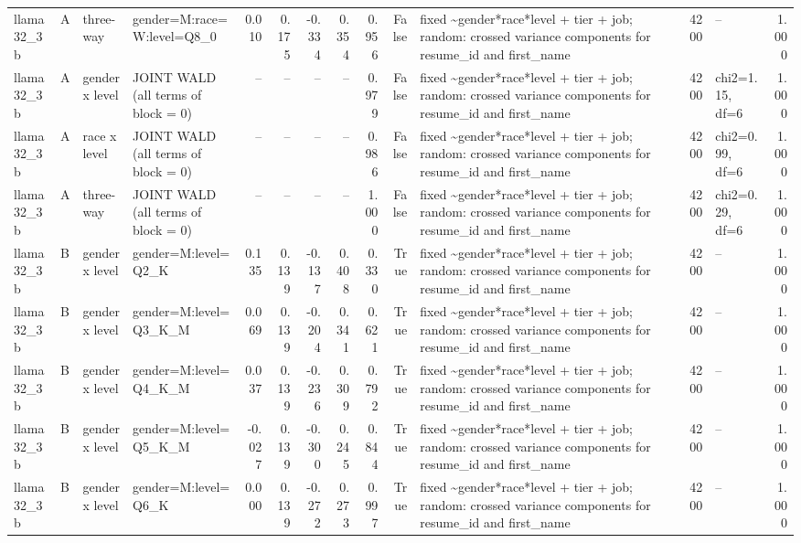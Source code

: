 \begin{tabular}{llllrrrrrrlrlr}
llama32\_3b & A & three-way & gender=M:race=W:level=Q8\_0 & 0.010 & 0.175 & -0.334 & 0.354 & 0.956 & False & fixed \textasciitilde \space gender*race*level + tier + job; random: crossed variance components for resume\_id and first\_name & 4200 & -- & 1.000 \\
llama32\_3b & A & gender x level & JOINT WALD (all terms of block = 0) & -- & -- & -- & -- & 0.979 & False & fixed \textasciitilde \space gender*race*level + tier + job; random: crossed variance components for resume\_id and first\_name & 4200 & chi2=1.15, df=6 & 1.000 \\
llama32\_3b & A & race x level & JOINT WALD (all terms of block = 0) & -- & -- & -- & -- & 0.986 & False & fixed \textasciitilde \space gender*race*level + tier + job; random: crossed variance components for resume\_id and first\_name & 4200 & chi2=0.99, df=6 & 1.000 \\
llama32\_3b & A & three-way & JOINT WALD (all terms of block = 0) & -- & -- & -- & -- & 1.000 & False & fixed \textasciitilde \space gender*race*level + tier + job; random: crossed variance components for resume\_id and first\_name & 4200 & chi2=0.29, df=6 & 1.000 \\
llama32\_3b & B & gender x level & gender=M:level=Q2\_K & 0.135 & 0.139 & -0.137 & 0.408 & 0.330 & True & fixed \textasciitilde \space gender*race*level + tier + job; random: crossed variance components for resume\_id and first\_name & 4200 & -- & 1.000 \\
llama32\_3b & B & gender x level & gender=M:level=Q3\_K\_M & 0.069 & 0.139 & -0.204 & 0.341 & 0.621 & True & fixed \textasciitilde \space gender*race*level + tier + job; random: crossed variance components for resume\_id and first\_name & 4200 & -- & 1.000 \\
llama32\_3b & B & gender x level & gender=M:level=Q4\_K\_M & 0.037 & 0.139 & -0.236 & 0.309 & 0.792 & True & fixed \textasciitilde \space gender*race*level + tier + job; random: crossed variance components for resume\_id and first\_name & 4200 & -- & 1.000 \\
llama32\_3b & B & gender x level & gender=M:level=Q5\_K\_M & -0.027 & 0.139 & -0.300 & 0.245 & 0.844 & True & fixed \textasciitilde \space gender*race*level + tier + job; random: crossed variance components for resume\_id and first\_name & 4200 & -- & 1.000 \\
llama32\_3b & B & gender x level & gender=M:level=Q6\_K & 0.000 & 0.139 & -0.272 & 0.273 & 0.997 & True & fixed \textasciitilde \space gender*race*level + tier + job; random: crossed variance components for resume\_id and first\_name & 4200 & -- & 1.000 \\

\end{tabular}
